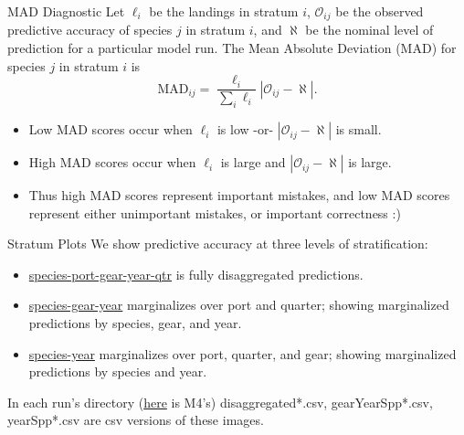 \documentclass[ xcolor = pdftex, dvipsnames, table ]{beamer}
\begin{document}
%
\begin{frame}{MAD Diagnostic}
Let $\ell_i$ be the landings in stratum $i$, $\mathcal{O}_{ij}$ be the observed 
predictive accuracy of species $j$ in stratum $i$, and $\aleph$ be the nominal level of 
prediction for a particular model run. The Mean Absolute Deviation (MAD) for species 
$j$ in stratum $i$ is 
	\begin{equation*} %
		\text{MAD}_{ij} = \frac{\ell_i}{\sum_i \ell_i}\left| \mathcal{O}_{ij}-\aleph \right|.
	\end{equation*}
\begin{itemize}
\item Low MAD scores occur when $\ell_i$ is low -or- $\left|\mathcal{O}_{ij}-\aleph\right|$ is small.

\item High MAD scores occur when $\ell_i$ is large and $\left|\mathcal{O}_{ij}-\aleph\right|$ is large.

\item Thus high MAD scores represent important mistakes, and low MAD scores 
represent either unimportant mistakes, or important correctness :) 

\end{itemize}
\end{frame}

%
%

%
\begin{frame}{Stratum Plots}
	We show predictive accuracy at three levels of stratification: 
	\begin{itemize}
	\item \href{https://github.com/gasduster99/sppComp/tree/master/sscRuns/25019781982M4/species-port-gear-year-qtr/}{species-port-gear-year-qtr} is fully disaggregated predictions.
	\item \href{https://github.com/gasduster99/sppComp/tree/master/sscRuns/25019781982M4/species-gear-year/}{species-gear-year} marginalizes over port and quarter; showing marginalized predictions by species, gear, and year.
	\item \href{https://github.com/gasduster99/sppComp/tree/master/sscRuns/25019781982M4/species-year/}{species-year} marginalizes over port, quarter, and gear; showing marginalized predictions by species and year.
	\end{itemize} 
	In each run's directory (\href{https://github.com/gasduster99/sppComp/tree/master/sscRuns/25019781982M4}{here} is M4's) disaggregated*.csv, gearYearSpp*.csv, yearSpp*.csv are csv versions of these images. 
\end{frame}
\end{document}
